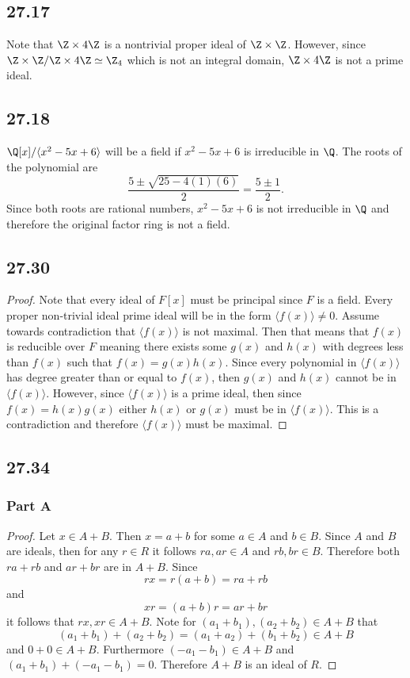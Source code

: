 \documentclass[12pt,titlepage]{extarticle}
\begin{document}
\subsection*{27.17}
Note that $\Z \times 4 \Z$ is a nontrivial proper ideal of $\Z \times \Z$. However, since $\Z \times \Z / \Z \times 4 \Z \simeq \Z_4$ which is not an integral domain, $\Z \times 4 \Z$ is not a prime ideal.

\subsection*{27.18}
$\Q[x] / \langle x^2 - 5x + 6 \rangle$ will be a field if $x^2 - 5x + 6$ is irreducible in $\Q$. The roots of the polynomial are
\[
    \frac{5 \pm \sqrt{25 - 4(1)(6)}}{2} = \frac{5 \pm 1}{2}
.\]
Since both roots are rational numbers, $x^2 - 5x + 6$ is not irreducible in $\Q$ and therefore the original factor ring is not a field.

\subsection*{27.30}
\begin{proof}
    Note that every ideal of $F[x]$ must be principal since $F$ is a field. Every proper non-trivial ideal prime ideal will be in the form $\langle f(x) \rangle \neq 0$. Assume towards contradiction that $\langle f(x) \rangle$ is not maximal. Then that means that $f(x)$ is reducible over $F$ meaning there exists some $g(x)$ and $h(x)$ with degrees less than $f(x)$ such that $f(x) = g(x) h(x)$. Since every polynomial in $\langle f(x) \rangle$ has degree greater than or equal to $f(x)$, then $g(x)$ and $h(x)$ cannot be in $\langle f(x) \rangle$. However, since $\langle f(x) \rangle$ is a prime ideal, then since $f(x) = h(x) g(x)$ either $h(x)$ or $g(x)$ must be in $\langle f(x) \rangle$. This is a contradiction and therefore $\langle f(x) \rangle$ must be maximal.
\end{proof}

\subsection*{27.34}
\subsubsection*{Part A}
\begin{proof}
    Let $x \in A + B$. Then $x = a + b$ for some $a \in A$ and $b \in B$. Since $A$ and $B$ are ideals, then for any $r \in R$ it follows $ra, ar \in A$ and $rb, br \in B$. Therefore both $ra + rb$ and $ar + br$ are in $A + B$. Since
    \[
        rx = r(a+b) = ra + rb
    \]
    and
    \[
        xr = (a+b)r = ar + br
    \]
    it follows that $rx, xr \in A+B$. Note for $(a_1 + b_1),(a_2 + b_2) \in A+B$ that
    \[
        (a_1 + b_1) + (a_2 + b_2) = (a_1 + a_2) + (b_1 + b_2) \in A + B
    \]
    and $0 + 0 \in A + B$. Furthermore $(-a_1 - b_1) \in A + B$ and $(a_1 + b_1) + (-a_1 - b_1) = 0$. Therefore $A + B$ is an ideal of $R$.
\end{proof}
\end{document}
